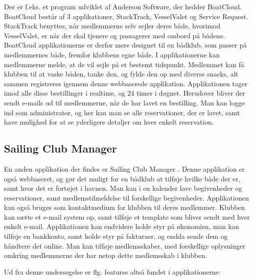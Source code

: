 Der er f.eks. et program udviklet af Anderson Software, der hedder BoatCloud.\citep{BoatCloud} BoatCloud består af 3
applikationer, StackTrack, VesselValet og Service Request.  
StackTrack benyttes, når medlemmerne selv sejler deres både,
hvorimod VesselValet, er når der skal tjenere og passagerer med ombord på bådene. BoatCloud applikationerne er derfor
mere designet til en bådklub, som passer på medlemmernes både, fremfor klubbens egne både. I
applikationerne kan medlemmerne melde, at de vil sejle på et bestemt tidspunkt. Medlemmet kan få klubben til at vaske
båden, tanke den, og fylde den op med diverse snacks, alt sammen registreres igennem denne webbaserede applikation.
Applikationen tager imod alle disse bestillinger i realtime, og 24 timer i døgnet. Herudover bliver der sendt e-mails ud
til medlemmerne, når de har lavet en bestilling. Man kan logge ind som administrator, og her kan man se alle
reservationer, der er lavet, samt have mulighed for at se yderligere detaljer om hver enkelt reservation.


\subsection*{Sailing Club Manager}

En anden applikation der findes er Sailing Club Manager \citep{SailClub}. Denne applikation er også webbaseret, og gør
det muligt for en bådklub at tilføje hvilke både der er, samt hvor det er fortøjet i havnen. Man kan i en kalender lave
begivenheder og reservationer, samt medlemstilmeldelse til forskellige begivenheder. Applikationen kan også bruges som kontaktmedium for
klubben til deres medlemmer. Klubben kan sætte et e-mail system op, samt tilføje et template som bliver sendt med hver
enkelt e-mail. Applikationen kan endvidere holde styr på økonomien, man kan tilføje en bankkonto, samt  holde styr på
fakturaer, og endda sende dem og håndtere det online. Man kan tilføje medlemsskaber, med forskellige oplysninger omkring
medlemmerne der har netop dette medlemsskab i klubben.

Ud fra denne undersøgelse er flg. features altså fundet i applikationerne:

